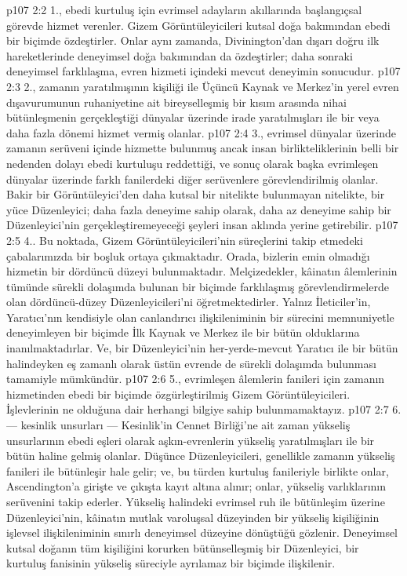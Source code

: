 \vs p107 2:2 1., ebedi kurtuluş için evrimsel adayların akıllarında başlangıçsal görevde hizmet verenler. Gizem Görüntüleyicileri kutsal doğa bakımından ebedi bir biçimde özdeştirler. Onlar aynı zamanda, Divinington’dan dışarı doğru ilk hareketlerinde deneyimsel doğa bakımından da özdeştirler; daha sonraki deneyimsel farklılaşma, evren hizmeti içindeki mevcut deneyimin sonucudur.
\vs p107 2:3 2.\bibnobreakspace {}, zamanın yaratılmışının kişiliği ile Üçüncü Kaynak ve Merkez’in yerel evren dışavurumunun ruhaniyetine ait bireyselleşmiş bir kısım arasında nihai bütünleşmenin gerçekleştiği dünyalar üzerinde irade yaratılmışları ile bir veya daha fazla dönemi hizmet vermiş olanlar.
\vs p107 2:4 3.\bibnobreakspace {}, evrimsel dünyalar üzerinde zamanın serüveni içinde hizmette bulunmuş ancak insan birlikteliklerinin belli bir nedenden dolayı ebedi kurtuluşu reddettiği, ve sonuç olarak başka evrimleşen dünyalar üzerinde farklı fanilerdeki diğer serüvenlere görevlendirilmiş olanlar. Bakir bir Görüntüleyici’den daha kutsal bir nitelikte bulunmayan nitelikte, bir yüce Düzenleyici; daha fazla deneyime sahip olarak, daha az deneyime sahip bir Düzenleyici’nin gerçekleştiremeyeceği şeyleri insan aklında yerine getirebilir.
\vs p107 2:5 4.. Bu noktada, Gizem Görüntüleyicileri’nin süreçlerini takip etmedeki çabalarımızda bir boşluk ortaya çıkmaktadır. Orada, bizlerin emin olmadığı hizmetin bir dördüncü düzeyi bulunmaktadır. Melçizedekler, kâinatın âlemlerinin tümünde sürekli dolaşımda bulunan bir biçimde farklılaşmış görevlendirmelerde olan dördüncü\hyp{}düzey Düzenleyicileri’ni öğretmektedirler. Yalnız İleticiler’in, Yaratıcı’nın kendisiyle olan canlandırıcı ilişkileniminin bir sürecini memnuniyetle deneyimleyen bir biçimde İlk Kaynak ve Merkez ile bir bütün olduklarına inanılmaktadırlar. Ve, bir Düzenleyici’nin her\hyp{}yerde\hyp{}mevcut Yaratıcı ile bir bütün halindeyken eş zamanlı olarak üstün evrende de sürekli dolaşımda bulunması tamamiyle mümkündür.
\vs p107 2:6 5., evrimleşen âlemlerin fanileri için zamanın hizmetinden ebedi bir biçimde özgürleştirilmiş Gizem Görüntüleyicileri. İşlevlerinin ne olduğuna dair herhangi bilgiye sahip bulunmamaktayız.
\vs p107 2:7 6.\bibnobreakspace {} --- kesinlik unsurları --- Kesinlik’in Cennet Birliği’ne ait zaman yükseliş unsurlarının ebedi eşleri olarak aşkın\hyp{}evrenlerin yükseliş yaratılmışları ile bir bütün haline gelmiş olanlar. Düşünce Düzenleyicileri, genellikle zamanın yükseliş fanileri ile bütünleşir hale gelir; ve, bu türden kurtuluş fanileriyle birlikte onlar, Ascendington’a girişte ve çıkışta kayıt altına alınır; onlar, yükseliş varlıklarının serüvenini takip ederler. Yükseliş halindeki evrimsel ruh ile bütünleşim üzerine Düzenleyici’nin, kâinatın mutlak varoluşsal düzeyinden bir yükseliş kişiliğinin işlevsel ilişkileniminin sınırlı deneyimsel düzeyine dönüştüğü gözlenir. Deneyimsel kutsal doğanın tüm kişiliğini korurken bütünselleşmiş bir Düzenleyici, bir kurtuluş fanisinin yükseliş süreciyle ayrılamaz bir biçimde ilişkilenir.
